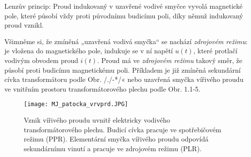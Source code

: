     Lenzův princip: Proud indukovaný v uzavřené vodivé smyčce vyvolá magnetické pole, které působí
    vždy proti původnímu budicímu poli, díky němuž indukovaný proud vznikl.

    Všimněme si, že zmíněná „uzavřená vodivá smyčka“ se nachází \emph{zdrojovém režimu}: je vložena
    do magnetického pole, indukuje se v ní napětí \(u(t)\), které protlačí vodivým obvodem proud
    \(i(t)\). Proud má ve \emph{zdrojovém režimu} takový směr, že působí proti budicímu magnetickému
    poli. Příkladem je již zmíněná sekundární cívka transformátoru podle Obr. /./-*/« nebo uzavřená
    smyčka vířivého proudu ve vnitřním prostoru transformátorového plechu podle Obr. 1.1-5.

    \begin{figure}[ht!]
      \centering
      \texttt{[image: MJ\_patocka\_vrvprd.JPG]}
      \caption[Vznik vířivého proudu uvnitř elektricky vodivého transformátorového plechu.]{Vznik
               vířivého proudu uvnitř elektricky vodivého transformátorového plechu. Budicí cívka
               pracuje ve spotřebičovém režimu (PPR). Elementární smyčka vířivého proudu odpovídá
          sekundárnímu vinutí a pracuje ve zdrojovém režimu (PLR).}
      \label{es:fig_MJ_patocka_vrvprd}    
    \end{figure}    

